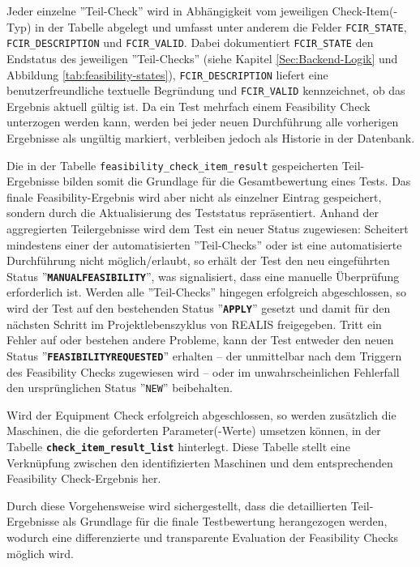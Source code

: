 Jeder einzelne ''Teil-Check'' wird in Abhängigkeit vom jeweiligen Check-Item(-Typ) in der Tabelle abgelegt und umfasst unter anderem die Felder \texttt{FCIR\_STATE}, \texttt{FCIR\_\-DESCRIPTION} und \texttt{FCIR\_VALID}. Dabei dokumentiert \texttt{FCIR\_STATE} den Endstatus des jeweiligen ''Teil-Checks'' (siehe Kapitel \ref{Sec:Backend-Logik} und Abbildung \ref{tab:feasibility-states}), \texttt{FCIR\_DESCRIPTION} liefert eine benutzerfreundliche textuelle Begründung und \texttt{FCIR\_VALID} kennzeichnet, ob das Ergebnis aktuell gültig ist. Da ein Test mehrfach einem Feasibility Check unterzogen werden kann, werden bei jeder neuen Durchführung alle vorherigen Ergebnisse als ungültig markiert, verbleiben jedoch als Historie in der Datenbank.

Die in der Tabelle \texttt{feasibility\_check\_item\_result} gespeicherten Teil-Ergebnisse bilden somit die Grundlage für die Gesamtbewertung eines Tests. Das finale Feasibility-Ergebnis wird aber nicht als einzelner Eintrag gespeichert, sondern durch die Aktualisierung des Teststatus repräsentiert. Anhand der aggregierten Teilergebnisse wird dem Test ein neuer Status zugewiesen: Scheitert mindestens einer der automatisierten ''Teil-Checks'' oder ist eine automatisierte Durchführung nicht möglich/erlaubt, so erhält der Test den neu eingeführten Status ''\textbf{\texttt{MANUALFEASIBILITY}}'', was signalisiert, dass eine manuelle Überprüfung erforderlich ist. Werden alle ''Teil-Checks'' hingegen erfolgreich abgeschlossen, so wird der Test auf den bestehenden Status ''\textbf{\texttt{APPLY}}'' gesetzt und damit für den nächsten Schritt im Projektlebenszyklus von REALIS freigegeben. Tritt ein Fehler auf oder bestehen andere Probleme, kann der Test entweder den neuen Status ''\textbf{\texttt{FEASIBILITYREQUESTED}}'' erhalten – der unmittelbar nach dem Triggern des Feasibility Checks zugewiesen wird – oder im unwahrscheinlichen Fehlerfall den ursprünglichen Status ''\texttt{NEW}'' beibehalten.

Wird der Equipment Check erfolgreich abgeschlossen, so werden zusätzlich die Maschinen, die die geforderten Parameter(-Werte) umsetzen können, in der Tabelle \textbf{\texttt{check\_item\-\_result\_list}} hinterlegt. Diese Tabelle stellt eine Verknüpfung zwischen den identifizierten Maschinen und dem entsprechenden Feasibility Check-Ergebnis her.

Durch diese Vorgehensweise wird sichergestellt, dass die detaillierten Teil-Ergebnisse als Grundlage für die finale Testbewertung herangezogen werden, wodurch eine differenzierte und transparente Evaluation der Feasibility Checks möglich wird.





